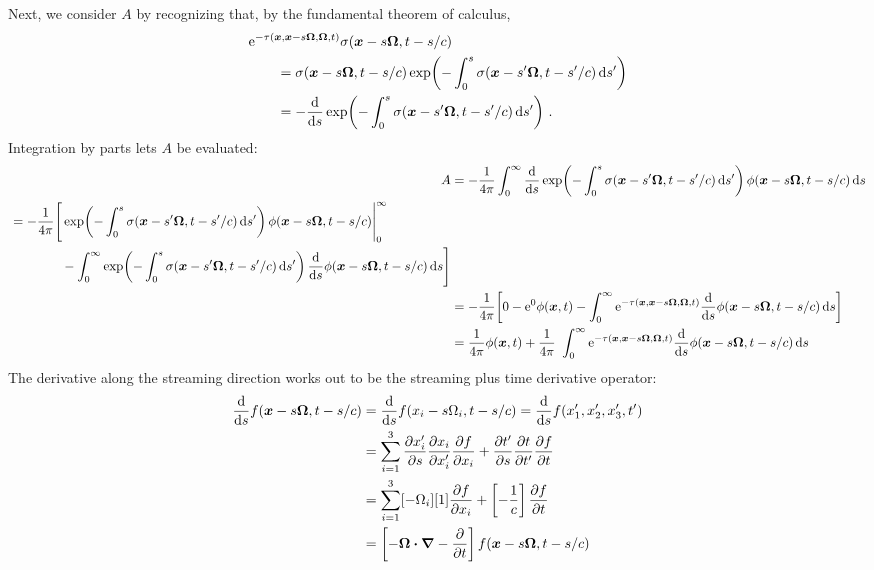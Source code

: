 Next, we consider $A$ by recognizing that, by the fundamental theorem of
calculus,
\begin{align*}
  \lefteqn{\eexp^{ -\tau(\vec{x}, \vec{x} - s \vec{\Omega}, \vec{\Omega}, t)}
  \sigma(\vec{x} - s \vec{\Omega}, t-s/c)}\qquad&
  \\
  &= \sigma(\vec{x} - s \vec{\Omega}, t-s/c) \expp{ -\int_{0}^{s}
  \sigma(\vec{x}-s'\vec{\Omega}, t-s'/c) \ud s'}
  \\
  &= -\oder{}{s}
    \expp{ -\int_{0}^{s} \sigma(\vec{x}-s'\vec{\Omega}, t-s'/c) \ud s'}\,.
\end{align*}
Integration by parts lets $A$ be evaluated:
\begin{align*}
  A &= 
  -\frac{1}{4\pi}\int_{0}^{\infty}
  \oder{}{s}
    \expp{- \int_{0}^{s} \sigma(\vec{x}-s'\vec{\Omega}, t-s'/c) \ud s'}
  \phi(\vec{x} - s \vec{\Omega}, t-s/c)
  \ud s
  \\
    \begin{split}
  &=-\frac{1}{4\pi} \Bigg[ 
\expp{- \int_{0}^{s} \sigma(\vec{x}-s'\vec{\Omega}, t-s'/c) \ud s'} 
\phi(\vec{x} - s \vec{\Omega}, t-s/c) \Bigg|_{0}^{\infty}
\\
&\qquad\qquad- \int_{0}^{\infty} \expp{- \int_{0}^{s} \sigma(\vec{x}-s'\vec{\Omega}, t-s'/c) \ud s'}
\oder{}{s} \phi(\vec{x} - s \vec{\Omega}, t-s/c)
\ud s
  \Bigg]
    \end{split}
  \\
  &=-\frac{1}{4\pi} \bigg[ 
0 -  
\eexp^0 \phi(\vec{x}, t)
- \int_{0}^{\infty} \eexp^{-\tau(\vec{x}, \vec{x} - s \vec{\Omega}, \vec{\Omega}, t)}
\oder{}{s} \phi(\vec{x} - s \vec{\Omega}, t-s/c)
\ud s
  \bigg]
  \\
 &=\frac{1}{4\pi}\phi(\vec{x}, t)
+ \frac{1}{4\pi}\ \int_{0}^{\infty} \eexp^{-\tau(\vec{x}, \vec{x} - s \vec{\Omega}, \vec{\Omega}, t)}
\oder{}{s} \phi(\vec{x} - s \vec{\Omega}, t-s/c)
\ud s
\end{align*}
The derivative along the streaming direction works out to be the streaming plus
time derivative operator:
\begin{align*}
  \frac{\mathrm{d} }{\mathrm{d} s} f(\bm{x} - s \bm{\Omega}, t-s/c)
  &=  \frac{\mathrm{d} }{\mathrm{d} s} f(x_i - s \Omega_i, t-s/c)
  = \frac{\mathrm{d} }{\mathrm{d} s} f(x_1',x_2',x_3',t')
  \\
  &= \sum_{i=1}^{3}
  \frac{\partial x_i'}{\partial s}\frac{\partial x_i}{\partial x_i'} \frac{\partial f}{\partial x_i}
  + \frac{\partial t'}{\partial s}\frac{\partial t}{\partial t'} \frac{\partial f}{\partial t}
  \\
  &= \sum_{i=1}^{3} [- \Omega_i][1]\frac{\partial f}{\partial x_i} 
  + \left[ -\frac{1}{c} \right]  \frac{\partial f}{\partial t}
  \\
  &= \left[ -\bm{\Omega} \bm{\cdot} \bm{\nabla} - \frac{\partial }{\partial t} \right]
    f(\bm{x} - s \bm{\Omega}, t-s/c)
\end{align*}
